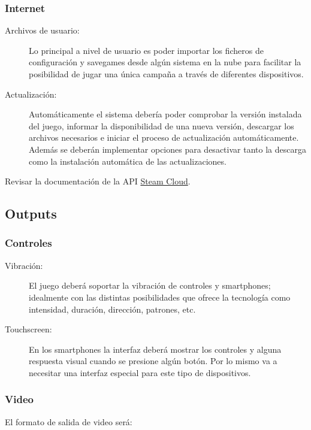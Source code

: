 \subsubsection{Internet}
\begin{description}
\item[Archivos de usuario:] Lo principal a nivel de usuario es poder importar los ficheros de configuración y savegames desde algún sistema en la nube para facilitar la posibilidad de jugar una única campaña a través de diferentes dispositivos.

\item[Actualización:] Automáticamente el sistema debería poder comprobar la versión instalada del juego, informar la disponibilidad de una nueva versión, descargar los archivos necesarios e iniciar el proceso de actualización automáticamente. Además se deberán implementar opciones para desactivar tanto la descarga como la instalación automática de las actualizaciones.
\end{description}

Revisar la documentación de la API \href{https://partner.steamgames.com/doc/features/cloud}{Steam Cloud}.

\subsection{Outputs}

\subsubsection{Controles}
\begin{description}
\item[Vibración:] El juego deberá soportar la vibración de controles y smartphones; idealmente con las distintas posibilidades que ofrece la tecnología como intensidad, duración, dirección, patrones, etc.

\item[Touchscreen:] En los smartphones la interfaz deberá mostrar los controles y alguna respuesta visual cuando se presione algún botón. Por lo mismo va a necesitar una interfaz especial para este tipo de dispositivos.
\end{description}

\subsubsection{Video}
\noindent El formato de salida de video será:

